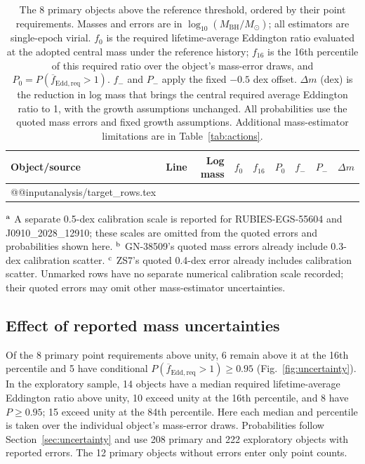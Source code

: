 \documentclass[11pt]{article}
\makeatletter
\newcommand{\mbh}{M_{\mathrm{BH}}}
\newcommand{\tableinput}[1]{\csname @@input\endcsname #1 }
\makeatother
\begin{document}
\begin{table}[htbp]
\centering
\caption{The 8 primary objects above the reference threshold, ordered by their point requirements.
Masses and errors are in $\log_{10}(\mbh/M_\odot)$; all estimators are single-epoch
virial. $f_0$ is the required lifetime-average Eddington ratio evaluated
at the adopted central mass under the reference history; $f_{16}$ is the
16th percentile of this required ratio over the object's mass-error draws,
and $P_0=P(\overline{f}_{\mathrm{Edd,req}}>1)$.
$f_-$ and $P_-$ apply the fixed $-0.5$ dex offset. $\Delta m$ (dex) is the
reduction in log mass that brings the central required average Eddington
ratio to 1, with the growth assumptions unchanged. All probabilities use
the quoted mass errors and fixed growth assumptions. Additional mass-estimator limitations are in Table~\ref{tab:actions}.}
\begingroup\small\setlength{\tabcolsep}{3pt}
\begin{tabular}{@{}>{\raggedright\arraybackslash}p{}lrrrrrrr@{}}
\toprule
Object/source & Line & Log mass & $f_0$ & $f_{16}$ & $P_0$ & $f_-$ & $P_-$ & $\Delta m$ \\
\midrule
\tableinput{analysis/target_rows.tex}
\bottomrule
\end{tabular}
\par\smallskip
\parbox{\textwidth}{\footnotesize
$^{\rm a}$ A separate 0.5-dex calibration scale is reported for
RUBIES-EGS-55604 and J0910\_2028\_12910; these scales are omitted from the
quoted errors and probabilities shown here. $^{\rm b}$ GN-38509's quoted
mass errors already include 0.3-dex calibration scatter. $^{\rm c}$ ZS7's quoted 0.4-dex error
already includes calibration scatter. Unmarked rows have no separate
numerical calibration scale recorded; their quoted errors may omit other
mass-estimator uncertainties.}
\endgroup
\label{tab:top}
\end{table}

\FloatBarrier
\subsection{Effect of reported mass uncertainties}

Of the 8 primary point requirements above unity, 6 remain above it at
the 16th percentile and 5 have conditional $P(\overline{f}_{\mathrm{Edd,req}}>1)\geq0.95$
(Fig.~\ref{fig:uncertainty}). In the exploratory sample, 14 objects have
a median required lifetime-average Eddington ratio above unity, 10 exceed
unity at the 16th percentile, and 8 have $P\geq0.95$; 15 exceed unity
at the 84th percentile. Here each median and percentile is taken over the
individual object's mass-error draws. Probabilities follow Section~\ref{sec:uncertainty} and use
208 primary and 222 exploratory objects with reported errors. The 12 primary
objects without errors enter only point counts.
\end{document}
